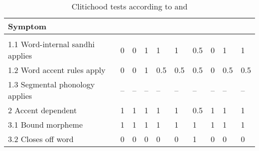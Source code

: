 \begin{table}[p]
\caption{Clitichood tests according to \citet{klavans1985} and 
	\citet{zwicky1985}}
\smaller
\begin{tabu} to \linewidth {H[10l] X[c] X[c] X[c] X[c] X[c] X[c] X[c] X[c] X[c]}
\toprule\tableheaderfont

Symptom
	& 
	& 
	& 
	& 
	& 
	& 
	& 
	& 
	& 
	\\

\toprule
\tableheaderfont{} \\
\toprule

1.1 Word-internal sandhi applies
	& 0	%
	& 0	%
	& 1	%
	& 1	%
	& 1	%
	& 0.5	%
	& 0	%
	& 1	%
	& 1	%
	\\ \midrule

1.2 Word accent rules apply
	& 0	%
	& 0	%
	& 1	%
	& 0.5	%
	& 0.5	%
	& 0.5	%
	& 0	%
	& 0.5	%
	& 0.5	%
	\\ \midrule

1.3 Segmental phonology applies
	& --	%
	& --	%
	& --	%
	& --	%
	& --	%
	& --	%
	& --	%
	& --	%
	& --	%
	\\ \midrule

2 Accent dependent
	& 1	%
	& 1	%
	& 1	%
	& 1	%
	& 1	%
	& 0.5	%
	& 1	%
	& 1	%
	& 1	%
	\\ \midrule

3.1 Bound morpheme
	& 1	%
	& 1	%
	& 1	%
	& 1	%
	& 1	%
	& 1	%
	& 1	%
	& 1	%
	& 1	%
	\\ \midrule

3.2 Closes off word
	& 0	%
	& 0	%
	& 0	%
	& 0	%
	& 0	%
	& 1	%
	& 0	%
	& 0	%
	& 0	%
	\\ \midrule


\end{tabu}
\end{table}
